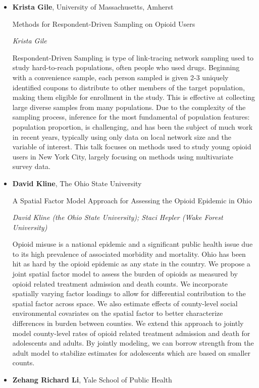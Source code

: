 \begin{itemize}
\item \textbf{Krista Gile}, University of Massachusetts, Amherst

Methods for Respondent-Driven Sampling on Opioid Users

\emph{\footnotesize Krista Gile}

Respondent-Driven Sampling is type of link-tracing network sampling used to study hard-to-reach populations, often people who used drugs.  Beginning with a convenience sample, each person sampled is given 2-3 uniquely identified coupons to distribute to other members of the target population, making them eligible for enrollment in the study. This is effective at collecting large diverse samples from many populations. Due to the complexity of the sampling process, inference for the most fundamental of population features: population proportion, is challenging, and has been the subject of much work in recent years, typically using only data on local network size and the variable of interest. This talk focuses on methods used to study young opioid users in New York City, largely focusing on methods using multivariate survey data.


\item \textbf{David Kline}, The Ohio State University

A Spatial Factor Model Approach for Assessing the Opioid Epidemic in Ohio

\emph{\footnotesize David Kline (the Ohio State University); Staci Hepler (Wake Forest University)}

Opioid misuse is a national epidemic and a significant public health issue due to its high prevalence of associated morbidity and mortality.  Ohio has been hit as hard by the opioid epidemic as any state in the country.   We propose a joint spatial factor model to assess the burden of opioids as measured by opioid related treatment admission and death counts.  We incorporate spatially varying factor loadings to allow for differential contribution to the spatial factor across space.  We also estimate effects of county-level social environmental covariates on the spatial factor to better characterize differences in burden between counties.  We extend this approach to jointly model county-level rates of opioid related treatment admission and death for adolescents and adults. By jointly modeling, we can borrow strength from the adult model to stabilize estimates for adolescents which are based on smaller counts.

\item \textbf{Zehang Richard Li}, Yale School of Public Health


\end{itemize}
